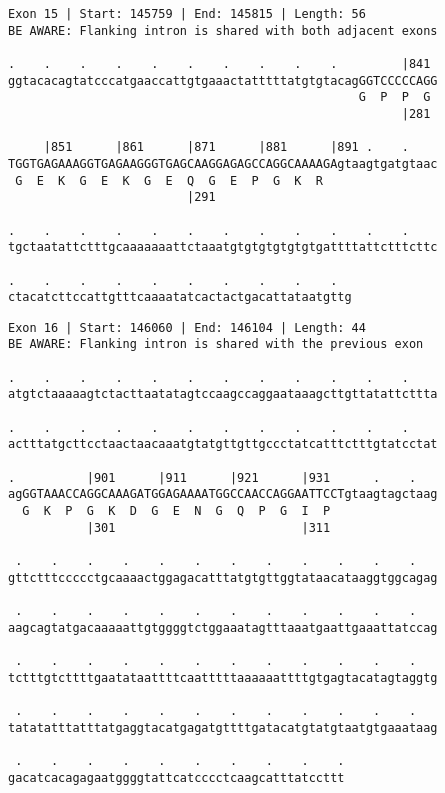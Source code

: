 \documentclass{article}
\begin{document}
\newpage
\begin{Verbatim}
Exon 15 | Start: 145759 | End: 145815 | Length: 56
BE AWARE: Flanking intron is shared with both adjacent exons
 
.    .    .    .    .    .    .    .    .    .         |841 
ggtacacagtatcccatgaaccattgtgaaactatttttatgtgtacagGGTCCCCCAGG
                                                 G  P  P  G 
                                                       |281 
  
     |851      |861      |871      |881      |891 .    .    
TGGTGAGAAAGGTGAGAAGGGTGAGCAAGGAGAGCCAGGCAAAAGAgtaagtgatgtaac
 G  E  K  G  E  K  G  E  Q  G  E  P  G  K  R                
                         |291                               
  
.    .    .    .    .    .    .    .    .    .    .    .    
tgctaatattctttgcaaaaaaattctaaatgtgtgtgtgtgtgattttattctttcttc
  
.    .    .    .    .    .    .    .    .    .  
ctacatcttccattgtttcaaaatatcactactgacattataatgttg
\end{Verbatim}
\newpage
\begin{Verbatim}
Exon 16 | Start: 146060 | End: 146104 | Length: 44
BE AWARE: Flanking intron is shared with the previous exon
 
.    .    .    .    .    .    .    .    .    .    .    .    
atgtctaaaaagtctacttaatatagtccaagccaggaataaagcttgttatattcttta
  
.    .    .    .    .    .    .    .    .    .    .    .    
actttatgcttcctaactaacaaatgtatgttgttgccctatcatttctttgtatcctat
  
.          |901      |911      |921      |931      .    .   
agGGTAAACCAGGCAAAGATGGAGAAAATGGCCAACCAGGAATTCCTgtaagtagctaag
  G  K  P  G  K  D  G  E  N  G  Q  P  G  I  P               
           |301                          |311               
  
 .    .    .    .    .    .    .    .    .    .    .    .   
gttctttccccctgcaaaactggagacatttatgtgttggtataacataaggtggcagag
  
 .    .    .    .    .    .    .    .    .    .    .    .   
aagcagtatgacaaaaattgtggggtctggaaatagtttaaatgaattgaaattatccag
  
 .    .    .    .    .    .    .    .    .    .    .    .   
tctttgtcttttgaatataattttcaatttttaaaaaattttgtgagtacatagtaggtg
  
 .    .    .    .    .    .    .    .    .    .    .    .   
tatatatttatttatgaggtacatgagatgttttgatacatgtatgtaatgtgaaataag
  
 .    .    .    .    .    .    .    .    .    .
gacatcacagagaatggggtattcatcccctcaagcatttatccttt
\end{Verbatim}
\end{document}
